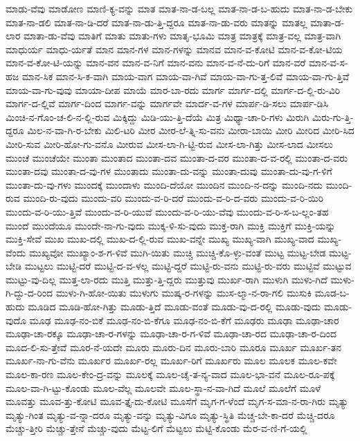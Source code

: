 {ಮಾಡು-ವೆವು
ಮಾಡೋಣ
ಮಾಣಿ-ಕ್ಯ-ವನ್ನು
ಮಾತ
ಮಾತ-ನಾ-ಡ-ಬಲ್ಲ
ಮಾತ-ನಾ-ಡ-ಬ-ಹುದು
ಮಾತ-ನಾ-ಡ-ಬೇಕು
ಮಾತ-ನಾ-ಡಲಿ
ಮಾತ-ನಾ-ಡಿ-ದರೆ
ಮಾತ-ನಾ-ಡು-ತ್ತಿ-ದ್ದರೂ
ಮಾತ-ನಾ-ಡು-ವರು
ಮಾತನ್ನು
ಮಾತಲ್ಲ
ಮಾತಾ-ಡ-ಲಾರ
ಮಾತಾ-ಡು-ವೆವು
ಮಾತಿಗೆ
ಮಾತು
ಮಾತು-ಗಳು
ಮಾತೃ-ಭೂಮಿ
ಮಾತ್ರ
ಮಾತ್ರಕ್ಕೆ
ಮಾತ್ರ-ವಲ್ಲ
ಮಾತ್ರ-ವಾಗಿ
ಮಾಧುರ್ಯ
ಮಾಧು-ರ್ಯತೆ
ಮಾನ
ಮಾನ-ಗಳ
ಮಾನ-ಗಳನ್ನು
ಮಾನವ
ಮಾನ-ವ-ಕೋಟಿ
ಮಾನ-ವ-ಕೋ-ಟಿಯ
ಮಾನ-ವ-ಕೋ-ಟಿ-ಯನ್ನು
ಮಾನ-ವನ
ಮಾನ-ವ-ನಿಗೆ
ಮಾನ-ವನು
ಮಾನ-ವ-ನೆ-ದು-ರಿಗೆ
ಮಾನ-ವರೆ
ಮಾನ-ವ-ಸ-ಹಜ
ಮಾನ-ಸಿಕ
ಮಾನ-ಸಿ-ಕ-ವಾಗಿ
ಮಾಯ-ವಾಗ
ಮಾಯ-ವಾ-ಗಿವೆ
ಮಾಯ-ವಾ-ಗು-ತ್ತ-ಲಿವೆ
ಮಾಯ-ವಾ-ಗು-ತ್ತಿವೆ
ಮಾಯ-ವಾ-ಗು-ವುವು
ಮಾಯಾ-ದೀಪ
ಮಾಯೆ
ಮಾರ-ಬಾ-ರದು
ಮಾರ್ಗ
ಮಾರ್ಗ-ದಲ್ಲಿ
ಮಾರ್ಗ-ದ-ಲ್ಲಿ-ರು-ವಿರಿ
ಮಾರ್ಗ-ದ-ಲ್ಲಿವೆ
ಮಾರ್ಗ-ದಿಂದ
ಮಾರ್ಗ-ವನ್ನು
ಮಾರ್ಗವೇ
ಮಾರ್ದ-ವ-ಗಳ
ಮಾರ್ಪ-ಡಿ-ಸಲು
ಮಾರ್ಪ-ಡಿಸಿ
ಮಿಂಚಿ-ನ-ಗೊಂ-ಚ-ಲಿ-ನ-ಲ್ಲಿ-ರುವ
ಮಿಕ್ಕಿದ್ದು
ಮಿಡಿ-ಯು-ತ್ತಿ-ದೆಯೆ
ಮಿತ್ರ
ಮಿಥ್ಯಾ-ಚಾ-ರಿ-ಗಳು
ಮಿರುಗಿ
ಮಿರು-ಗು-ತ್ತಿ-ದ್ದರೂ
ಮಿಲ-ನ-ವಾ-ಗಿ-ರ-ಬೇಕು
ಮಿಲಿ-ಟರಿ
ಮೀರ
ಮೀರ-ಲೆ-ತ್ನಿ-ಸು-ವನು
ಮೀರಾ-ಬಾಯಿ
ಮೀರಿ
ಮೀರಿದ
ಮೀರಿ-ಸಿದ
ಮೀರಿ-ಸುವ
ಮೀರಿ-ಹೋ-ಗು-ವನೊ
ಮೀರುವ
ಮೀಸ-ಲಾ-ಗಿ-ಟ್ಟಿ-ರುವ
ಮೀಸ-ಲಾ-ಗಿತ್ತು
ಮೀಸ-ಲಾದ
ಮೀಸಲು
ಮುಂಚೆ
ಮುಂಚೆಯೇ
ಮುಂತಾ
ಮುಂತಾದ
ಮುಂತಾ-ದವ
ಮುಂತಾ-ದ-ವರ
ಮುಂತಾ-ದ-ವ-ರಲ್ಲಿ
ಮುಂತಾ-ದ-ವರು
ಮುಂತಾ-ದವು
ಮುಂತಾ-ದ-ವು-ಗಳ
ಮುಂತಾದು
ಮುಂತಾ-ದು-ವನ್ನು
ಮುಂತಾ-ದುವು
ಮುಂತಾ-ದು-ವು-ಗ-ಳಿಗೆ
ಮುಂತಾ-ದು-ವು-ಗಳು
ಮುಂದಕ್ಕೆ
ಮುಂದಾಳು
ಮುಂದಿ-ದೆಯೋ
ಮುಂದಿನ
ಮುಂದಿ-ನ-ದನ್ನು
ಮುಂದಿ-ನದು
ಮುಂದಿ-ರುವ
ಮುಂದಿ-ರು-ವುದು
ಮುಂದು-ವರಿ
ಮುಂದು-ವ-ರಿ-ದರೆ
ಮುಂದು-ವ-ರಿ-ದ-ವರು
ಮುಂದು-ವ-ರಿ-ಯಿರಿ
ಮುಂದು-ವ-ರಿ-ಯು-ತ್ತಿವೆ
ಮುಂದು-ವ-ರಿ-ಯುವೆ
ಮುಂದು-ವ-ರಿ-ಯು-ವೆವು
ಮುಂದು-ವ-ರಿ-ಸ-ಬ-ಲ್ಲಂ-ತಹ
ಮುಂದೆ
ಮುಂದೆಯೂ
ಮುಂದೇ-ನಾ-ಗು-ವುದು
ಮುಕ್ಕ-ಳಿ-ಸು-ವುದು
ಮುಕ್ತ-ರಾಗಿ
ಮುಕ್ತಿ
ಮುಕ್ತಿಗೆ
ಮುಕ್ತಿ-ಯನ್ನು
ಮುಕ್ತಿ-ಸೇವೆ
ಮುಖ
ಮುಖ-ದಲ್ಲಿ
ಮುಖ-ದ-ಲ್ಲಿ-ರುವ
ಮುಖ-ವನ್ನೇ
ಮುಖ್ಯ
ಮುಖ್ಯ-ವಾಗಿ
ಮುಖ್ಯ-ವಾದ
ಮುಖ್ಯ-ವೆಂದು
ಮುಖ್ಯವೋ
ಮುಖ್ಯಾಂ-ಶ-ಗ-ಳಿವೆ
ಮುಗಿ-ಯಿತು
ಮುಚ್ಚಿ
ಮುಚ್ಚಿ-ಕೊ-ಳ್ಳು-ವಂತೆ
ಮುಟ್ಟ
ಮುಟ್ಟ-ಬೇಡ
ಮುಟ್ಟ-ಬೇಡಿ
ಮುಟ್ಟಲು
ಮುಟ್ಟಿ-ದರೆ
ಮುಟ್ಟಿ-ದ-ವ-ಳಲ್ಲ
ಮುಟ್ಟಿ-ದ್ದರೆ
ಮುಟ್ಟಿ-ರು-ವನು
ಮುಟ್ಟಿ-ರು-ವರು
ಮುಟ್ಟಿವೆ
ಮುಟ್ಟುವ
ಮುಟ್ಟು-ವು-ದಿಲ್ಲ
ಮುತ್ತ-ಲಾ-ರದು
ಮುತ್ತಿ
ಮುತ್ತು-ತ್ತಿ-ದ್ದರು
ಮುತ್ತುವು
ಮುರ್ಖ-ರಾಗಿ
ಮುಳುಗಿ
ಮುಳು-ಗಿದೆ
ಮುಳು-ಗಿ-ದ್ದು-ದ-ರಿಂದ
ಮುಳು-ಗಿ-ಹೋ-ಯಿತು
ಮುಳುಗು
ಮುಷ್ಕ-ರ-ಗಳನ್ನು
ಮುಸ-ಲ್ಮಾ-ನ-ರಾ-ಗಲಿ
ಮುಸುಕಿ
ಮೂಡ-ಬ-ಹುದು
ಮೂಡಿದ
ಮೂಡಿ-ಹೋ-ಗಿತ್ತು
ಮೂಡು-ತ್ತಿದೆ
ಮೂಡು-ವಂತೆ
ಮೂಡು-ವು-ದ-ರಲ್ಲಿ
ಮೂಡು-ವುದು
ಮೂಡು-ವುದೊ
ಮೂಢ
ಮೂಢ-ನಂ-ಬಿಕೆ
ಮೂಢ-ನಂ-ಬಿ-ಕೆಗೂ
ಮೂಢ-ನಂ-ಬಿ-ಕೆಗೆ
ಮೂಢರು
ಮೂಢಾ
ಮೂಢಾ-ಚಾರ
ಮೂಢಾ-ಚಾ-ರಕ್ಕೂ
ಮೂಢಾ-ಚಾ-ರ-ಗಳನ್ನು
ಮೂಢಾ-ಚಾ-ರ-ಗ-ಳಿವೆ
ಮೂಢಾ-ಚಾ-ರದ
ಮೂಢಾ-ಚಾ-ರ-ದಿಂದ
ಮೂದ-ಲಿ-ಸು-ತ್ತೇವೆ
ಮೂರ-ನೆ-ಯದೇ
ಮೂರು
ಮೂರು-ದಿನ
ಮೂರು-ಬಾರಿ
ಮೂರೂ
ಮೂರ್ಖ
ಮೂರ್ಖ-ತನ
ಮೂರ್ಖ-ನಾ-ಗು-ವೆನು
ಮೂರ್ಖರ
ಮೂರ್ಖ-ರಲ್ಲ
ಮೂರ್ಖ-ರಿಗೆ
ಮೂರ್ಖರು
ಮೂಲ
ಮೂಲಕ
ಮೂಲ-ಕವೇ
ಮೂಲ-ಕಾ-ರಣ
ಮೂಲ-ಕೇಂ-ದ್ರ-ವನ್ನು
ಮೂಲಕ್ಕೆ
ಮೂಲ-ಚೈ-ತ-ನ್ಯ-ವಾದ
ಮೂಲ-ಭಾ-ವನೆ
ಮೂಲ-ರೂ-ಪಕ್ಕೆ
ಮೂಲ-ವಾ-ಗಿ-ಟ್ಟು-ಕೊಂಡು
ಮೂಲ-ವೆಲ್ಲ
ಮೂಲವೇ
ಮೂಲ-ಸ್ಥಾ-ನ-ವಾ-ಗಿದೆ
ಮೂಲೆ
ಮೂಲೆಗೆ
ಮೂಳೆ
ಮೂವತ್ತು
ಮೂವ-ತ್ತು-ಕೋಟಿ
ಮೂವ-ತ್ತೈ-ದು-ಕೋಟಿ
ಮೂಸೆಗೆ
ಮೃಗ-ಗ-ಳೆಂದೆ
ಮೃಗ-ಸ-ಮಾ-ನ-ರಾ-ಗಿರು
ಮೃತ್ಯು
ಮೃತ್ಯು-ಗಿಂತ
ಮೃತ್ಯು-ವ-ನ್ನಾ-ದರೂ
ಮೃತ್ಯು-ವನ್ನು
ಮೃತ್ಯು-ವಿಗೂ
ಮೃತ್ಯು-ಸ್ಥಿತಿ
ಮೆಚ್ಚ-ಬೇ-ಕಾ-ದರೆ
ಮೆಚ್ಚಿ-ದರೂ
ಮೆಚ್ಚು-ತ್ತೀರಿ
ಮೆಚ್ಚು-ತ್ತೇನೆ
ಮೆಚ್ಚು-ವುದು
ಮೆಟ್ಟ-ಲಿಗೆ
ಮೆಟ್ಟಲು
ಮೆಟ್ಟಿ-ಕೊಂಡು
ಮೆರ-ವ-ಣಿ-ಗೆ-ಯಲ್ಲಿ
}
